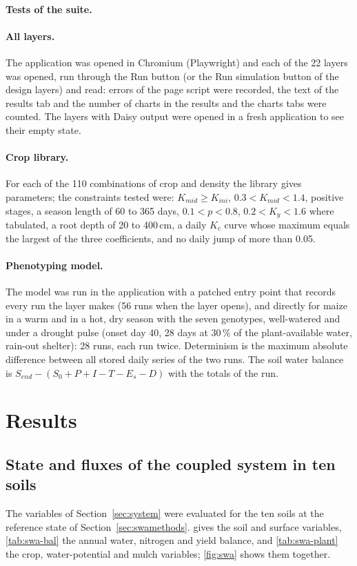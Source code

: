 \documentclass[preprint,12pt]{elsarticle}
\begin{document}
\paragraph{Tests of the suite.}
\paragraph{All layers.} The application was opened in Chromium (Playwright) and each of the 22 layers was opened, run through the Run button (or the Run simulation button of the design layers) and read: errors of the page script were recorded, the text of the results tab and the number of charts in the results and the charts tabs were counted. The layers with Daisy output were opened in a fresh application to see their empty state.

\paragraph{Crop library.} For each of the 110 combinations of crop and density the library gives parameters; the constraints tested were: $K_{mid}\ge K_{ini}$, $0.3<K_{mid}<1.4$, positive stages, a season length of 60 to 365 days, $0.1<p<0.8$, $0.2<K_y<1.6$ where tabulated, a root depth of 20 to 400\,cm, a daily $K_c$ curve whose maximum equals the largest of the three coefficients, and no daily jump of more than 0.05.

\paragraph{Phenotyping model.} The model was run in the application with a patched entry point that records every run the layer makes (56 runs when the layer opens), and directly for maize in a warm and in a hot, dry season with the seven genotypes, well-watered and under a drought pulse (onset day 40, 28 days at 30\,\% of the plant-available water, rain-out shelter): 28 runs, each run twice. Determinism is the maximum absolute difference between all stored daily series of the two runs. The soil water balance is $S_{end}-(S_0+P+I-T-E_s-D)$ with the totals of the run.


\section{Results}
\label{sec:results}
\subsection{State and fluxes of the coupled system in ten soils}
\label{sec:swa}
The variables of Section~\ref{sec:system} were evaluated for the ten soils at the reference state of Section~\ref{sec:swamethods}.  gives the soil and surface variables, \cref{tab:swa-bal} the annual water, nitrogen and yield balance, and \cref{tab:swa-plant} the crop, water-potential and mulch variables; \cref{fig:swa} shows them together.
\end{document}
